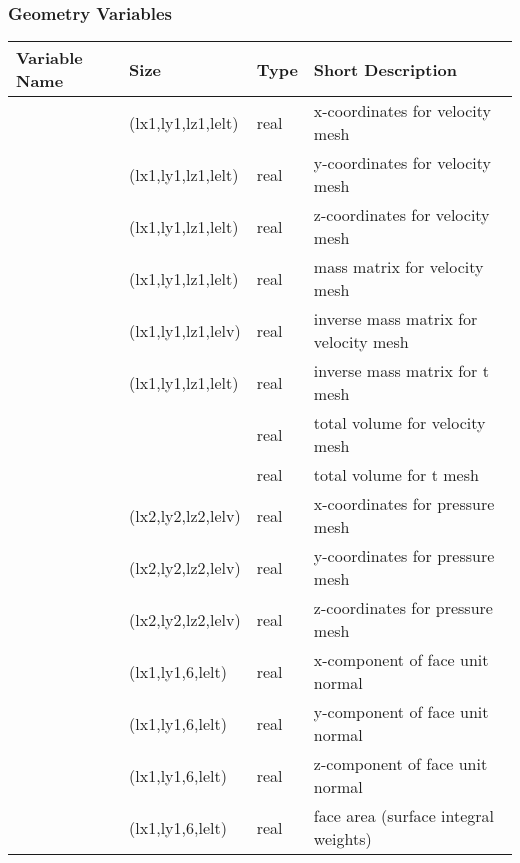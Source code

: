 \documentclass[letterpaper,10pt,english]{sphinxmanual}
\begin{document}
\subsubsection{Geometry Variables}
\label{\detokenize{appendix:geometry-variables}}

\begin{savenotes}\sphinxattablestart
\centering
\begin{tabulary}{\linewidth}[t]{|T|T|T|T|}
\hline
\sphinxstyletheadfamily 
Variable Name
&\sphinxstyletheadfamily 
Size
&\sphinxstyletheadfamily 
Type
&\sphinxstyletheadfamily 
Short Description
\\
\hline
{}
&
(lx1,ly1,lz1,lelt)
&
real
&
x-coordinates for velocity mesh
\\
\hline
{}
&
(lx1,ly1,lz1,lelt)
&
real
&
y-coordinates for velocity mesh
\\
\hline
{}
&
(lx1,ly1,lz1,lelt)
&
real
&
z-coordinates for velocity mesh
\\
\hline
{}
&
(lx1,ly1,lz1,lelt)
&
real
&
mass matrix for velocity mesh
\\
\hline
{}
&
(lx1,ly1,lz1,lelv)
&
real
&
inverse mass matrix for velocity mesh
\\
\hline
{}
&
(lx1,ly1,lz1,lelt)
&
real
&
inverse mass matrix for t mesh
\\
\hline
{}
&
\textendash{}
&
real
&
total volume for velocity mesh
\\
\hline
{}
&
\textendash{}
&
real
&
total volume for t mesh
\\
\hline
{}
&
(lx2,ly2,lz2,lelv)
&
real
&
x-coordinates for pressure mesh
\\
\hline
{}
&
(lx2,ly2,lz2,lelv)
&
real
&
y-coordinates for pressure mesh
\\
\hline
{}
&
(lx2,ly2,lz2,lelv)
&
real
&
z-coordinates for pressure mesh
\\
\hline
{}
&
(lx1,ly1,6,lelt)
&
real
&
x-component of face unit normal
\\
\hline
{}
&
(lx1,ly1,6,lelt)
&
real
&
y-component of face unit normal
\\
\hline
{}
&
(lx1,ly1,6,lelt)
&
real
&
z-component of face unit normal
\\
\hline
{}
&
(lx1,ly1,6,lelt)
&
real
&
face area (surface integral weights)
\\
\hline
\end{tabulary}
\par
\sphinxattableend\end{savenotes}
\end{document}
